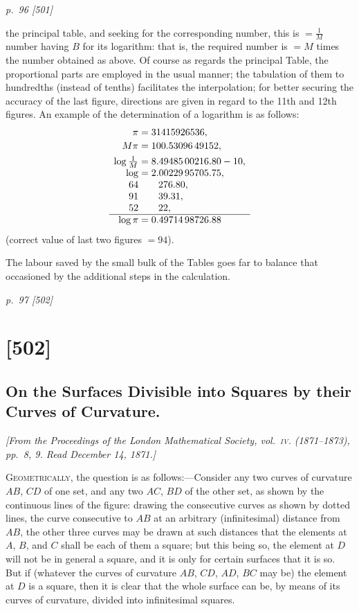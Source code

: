 \documentclass[11pt,a4paper]{article}
\newcommand{\sourcepage}[2]{%
  \bigskip
  \noindent\textit{p.~#1 [#2]}%
  \par\smallskip
}
\newcommand{\papersection}[2]{%
  \section{[#1]}
  \subsection{#2}
}
\newcommand{\fromjournal}[1]{%
  \begin{center}\textit{#1}\end{center}
}
\begin{document}
\sourcepage{96}{501}
the principal table, and seeking for the corresponding number, this is
$=\frac1M$ number having $B$ for its logarithm: that is, the required number is
$=M$ times the number obtained as above. Of course as regards the principal Table,
the proportional parts are employed in the usual manner; the tabulation of them
to hundredths (instead of tenths) facilitates the interpolation; for better securing
the accuracy of the last figure, directions are given in regard to the 11th and 12th
figures. An example of the determination of a logarithm is as follows:
\[
\begin{array}{r@{\;}l}
\pi &= 31415926536,\\[2pt]
M\pi &=100.53096\,49152,\\[4pt]
\log\frac1M &= 8.49485\,00216.80-10,\\
\log &= 2.00229\,95705.75,\\
64&\phantom{=}\quad 276.80,\\
91&\phantom{=}\quad 39.31,\\
52&\phantom{=}\quad 22,\\ \hline
\log \pi&=0.49714\,98726.88
\end{array}
\]
(correct value of last two figures $=94$).

The labour saved by the small bulk of the Tables goes far to balance that
occasioned by the additional steps in the calculation.

\sourcepage{97}{502}
\papersection{502}{On the Surfaces Divisible into Squares by their Curves of Curvature.}

\fromjournal{[From the Proceedings of the London Mathematical Society, vol.~\textsc{iv}. (1871--1873), pp.~8, 9. Read December 14, 1871.]}

\textsc{Geometrically}, the question is as follows:---Consider any two curves of
curvature $AB$, $CD$ of one set, and any two $AC$, $BD$ of the other set, as shown
by the continuous lines of the figure: drawing the consecutive curves as shown by
dotted lines, the curve consecutive to $AB$ at an arbitrary (infinitesimal) distance
from $AB$, the other three curves may be drawn at such distances that the elements
at $A$, $B$, and $C$ shall be each of them a square; but this being so, the element
at $D$ will not be in general a square, and it is only for certain surfaces that it
is so. But if (whatever the curves of curvature $AB$, $CD$, $AD$, $BC$ may be)
the element at $D$ is a square, then it is clear that the whole surface can be, by
means of its curves of curvature, divided into infinitesimal squares.
\end{document}
